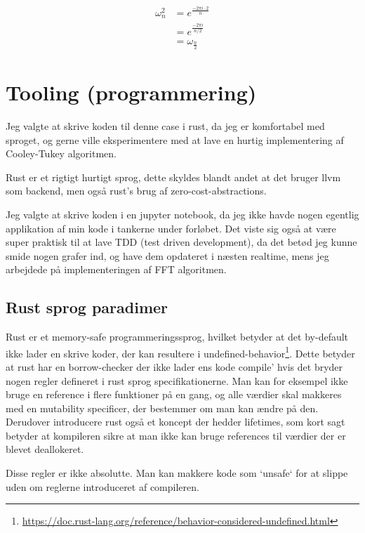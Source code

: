 \documentclass[11pt,a4paper]{article}
\begin{document}
\begin{equation}
\begin{split}
\omega_n^2 &= e^{\frac{-2\pi i \cdot 2}{n}} \\
&= e^{\frac{-2\pi i}{n/2}} \\
&= \omega_{\frac{n}{2}}
\end{split}
\end{equation}

\section{Tooling (programmering)}
\label{sec:org133d84f}
Jeg valgte at skrive koden til denne case i rust, da jeg er komfortabel med sproget,
og gerne ville eksperimentere med at lave en hurtig implementering af Cooley-Tukey algoritmen.

Rust er et rigtigt hurtigt sprog, dette skyldes blandt andet at det bruger llvm som backend,
men også rust's brug af zero-cost-abstractions.

Jeg valgte at skrive koden i en jupyter notebook, da jeg ikke havde nogen egentlig
applikation af min kode i tankerne under forløbet.
Det viste sig også at være super praktisk til at lave TDD (test driven development),
da det betød jeg kunne smide nogen grafer ind, og have dem opdateret i næsten realtime,
mens jeg arbejdede på implementeringen af FFT algoritmen.

\subsection{Rust sprog paradimer}
\label{sec:orgbe5837a}
Rust er et memory-safe programmeringssprog,
hvilket betyder at det by-default ikke lader en skrive koder, der kan resultere i undefined-behavior\footnote{\url{https://doc.rust-lang.org/reference/behavior-considered-undefined.html}}.
Dette betyder at rust har en borrow-checker der ikke lader ens kode compile' hvis det bryder nogen regler defineret i rust sprog specifikationerne.
Man kan for eksempel ikke bruge en reference i flere funktioner på en gang, og alle værdier skal makkeres med
en mutability specificer, der bestemmer om man kan ændre på den. Derudover introducere rust også et koncept der hedder lifetimes,
som kort sagt betyder at kompileren sikre at man ikke kan bruge references til værdier der er blevet deallokeret.

\bigskip

Disse regler er ikke absolutte. Man kan makkere kode som `unsafe` for at slippe uden om reglerne introduceret af compileren.
\end{document}
